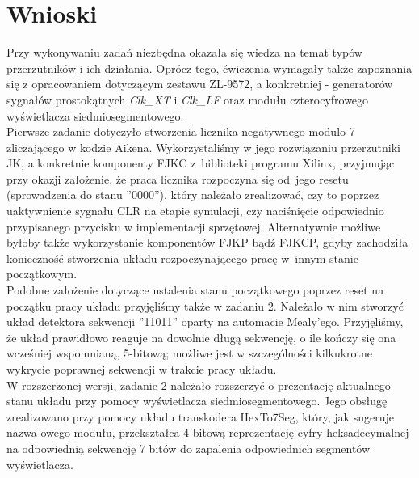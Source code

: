 \documentclass[a4paper,12pt]{extarticle}  %
\begin{document}
\section{Wnioski}

Przy wykonywaniu zadań niezbędna okazała się wiedza na temat typów przerzutników i ich działania. Oprócz tego, ćwiczenia wymagały także zapoznania się z opracowaniem dotyczącym zestawu ZL-9572, a konkretniej - generatorów sygnałów prostokątnych \textit{Clk\_XT} i \textit{Clk\_LF} oraz modułu czterocyfrowego wyświetlacza siedmiosegmentowego. \\
Pierwsze zadanie dotyczyło stworzenia licznika negatywnego modulo 7 zliczającego w kodzie Aikena. Wykorzystaliśmy w jego rozwiązaniu przerzutniki JK, a konkretnie komponenty FJKC z~biblioteki programu Xilinx, przyjmując przy okazji założenie, że praca licznika rozpoczyna się od~jego resetu (sprowadzenia do stanu ''0000''), który należało zrealizować, czy to poprzez uaktywnienie sygnału CLR na etapie symulacji, czy naciśnięcie odpowiednio przypisanego przycisku w implementacji sprzętowej. Alternatywnie możliwe byłoby także wykorzystanie komponentów FJKP bądź FJKCP, gdyby zachodziła konieczność stworzenia układu rozpoczynającego pracę w~innym stanie początkowym. \\
Podobne założenie dotyczące ustalenia stanu początkowego poprzez reset na początku pracy układu przyjęliśmy także w zadaniu 2. Należało w nim stworzyć układ detektora sekwencji ''11011'' oparty na automacie Mealy'ego. Przyjęliśmy, że układ prawidłowo reaguje na dowolnie długą sekwencję, o ile kończy się ona wcześniej wspomnianą, 5-bitową; możliwe jest w szczególności kilkukrotne wykrycie poprawnej sekwencji w trakcie pracy układu. \\
W rozszerzonej wersji, zadanie 2 należało rozszerzyć o prezentację aktualnego stanu układu przy pomocy wyświetlacza siedmiosegmentowego. Jego obsługę zrealizowano przy pomocy układu transkodera HexTo7Seg, który, jak sugeruje nazwa owego modułu, przekształca 4-bitową reprezentację cyfry heksadecymalnej na odpowiednią sekwencję 7 bitów do zapalenia odpowiednich segmentów wyświetlacza.
\end{document}
